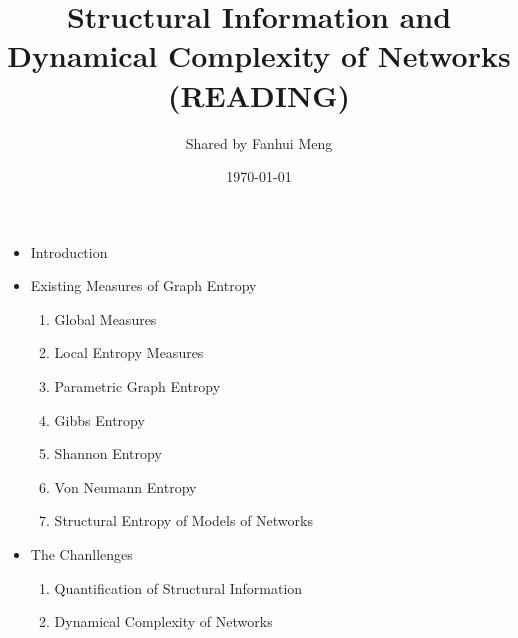 \documentclass[12pt,a4paper,onecolumn]{article}
\author{Shared by Fanhui Meng}
\title{Structural Information and Dynamical Complexity of Networks \\[1ex] \large (READING)}
\date{\today}
\begin{document}
  \maketitle
  
  \begin{itemize}
    \item Introduction
    \item Existing Measures of Graph Entropy
      \begin{enumerate}
        \item Global Measures
        \item Local Entropy Measures
        \item Parametric Graph Entropy
        \item Gibbs Entropy
        \item Shannon Entropy
        \item Von Neumann Entropy
        \item Structural Entropy of Models of Networks
      \end{enumerate}
    \item The Chanllenges
      \begin{enumerate}
        \item Quantification of Structural Information
        \item Dynamical Complexity of Networks
      \end{enumerate}
  \end{itemize}
\end{document}
